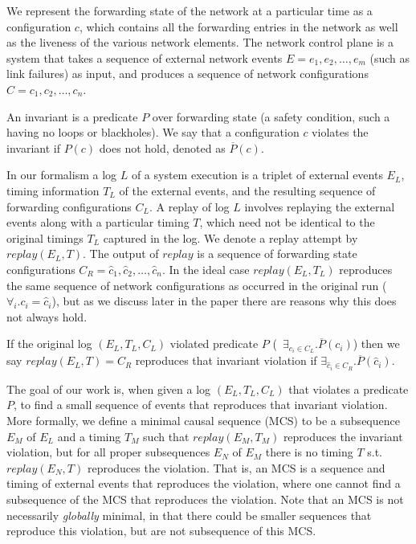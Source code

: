 
We represent the forwarding state of the network
at a particular time as a configuration $c$, which contains all the forwarding
entries in the network
as well as the liveness of the various network elements.
The network control plane is a system that takes a sequence of
external network events $E = e_1,e_2,\dots,e_m$ (such as link failures) as input,
and produces a sequence of network configurations
$C = c_1,c_2,\dots,c_n$.

An invariant is a predicate $P$ over forwarding state (a safety
condition, such a having no loops or blackholes). We say that a configuration
$c$ violates the invariant if $P(c)$ does not
hold, denoted as $\overline{P}(c)$.

In our formalism a log $L$ of a system execution is a triplet of external events $E_L$,
timing information $T_L$ of the external events, and the resulting sequence of forwarding
configurations $C_L$.
A replay of log $L$ involves replaying the external events along with a
particular timing $T$,
which need not be identical to the original timings $T_L$ captured in the log.
We denote a replay attempt by $replay(E_L,T)$.
The output of $replay$ is a sequence of forwarding state configurations
$C_R = \hat{c}_1,\hat{c}_2,\dots,\hat{c}_n$. In the ideal case $replay(E_L,T_L)$ reproduces the same
sequence of network configurations as occurred in the original run
(\ie~$\forall_i. c_i = \hat{c}_i$), but as we discuss later in the paper there are reasons why
this does not always hold.

If the original log $(E_L, T_L, C_L)$ violated predicate $P$
(\ie~$\exists_{c_i \in C_L}. \overline{P}(c_i)$)
then we say $replay(E_L,T) = C_R$ reproduces that invariant violation if
$\exists_{\hat{c}_i \in C_R}. \overline{P}(\hat{c}_i)$.

The goal of our work is, when given a log $(E_L, T_L, C_L)$ that violates a predicate $P$, to find a small sequence of events that reproduces that
invariant violation.  More formally, we define a minimal causal sequence (MCS)
to be a subsequence $E_M$
of $E_L$ and a timing $T_M$ such
that $replay(E_M,T_M)$ reproduces the invariant violation, but for all proper
subsequences $E_N$ of $E_M$
there is no timing $T$ s.t. $replay(E_N,T)$ reproduces the violation.
That is, an MCS is a sequence and timing of external events that reproduces the violation,
where one cannot find a subsequence of the MCS that reproduces the violation.
Note that an MCS is not necessarily {\em globally} minimal, in that there could be smaller
sequences that reproduce this violation, but are not subsequence of this MCS.

